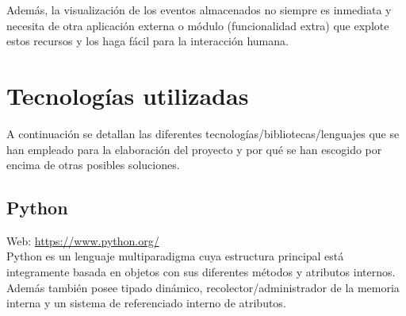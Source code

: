 Además, la visualización de los eventos almacenados no siempre es inmediata y necesita de otra aplicación externa o módulo (funcionalidad extra) que explote estos recursos y los haga fácil para la interacción humana.\\

\newpage
\section{Tecnologías utilizadas}

A continuación se detallan las diferentes tecnologías/bibliotecas/lenguajes que se han empleado para la elaboración del proyecto y por qué se han escogido por encima de otras posibles soluciones.

\subsection{Python}


Web: \url{https://www.python.org/}\\

Python es un lenguaje multiparadigma cuya estructura principal está integramente basada en objetos con sus diferentes métodos y atributos internos. Además también posee tipado dinámico, recolector/administrador de la memoria interna y un sistema de referenciado interno de atributos. \\

